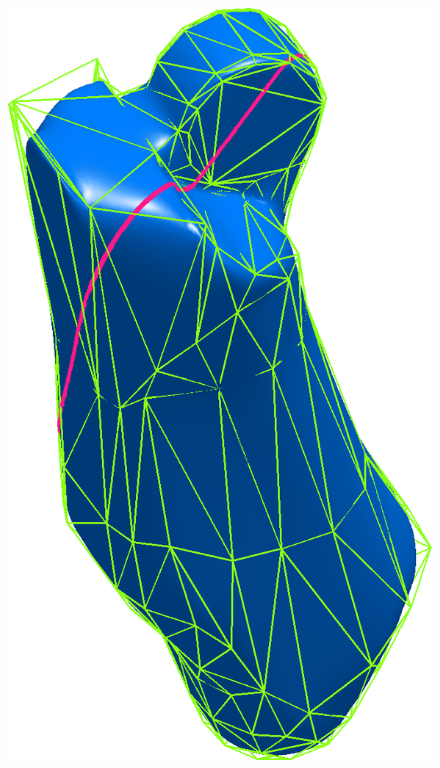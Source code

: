 \begin{figure}
  \centering
    \includegraphics[width = 0.2\paperwidth]{leg3smooth.png}

\end{figure}
